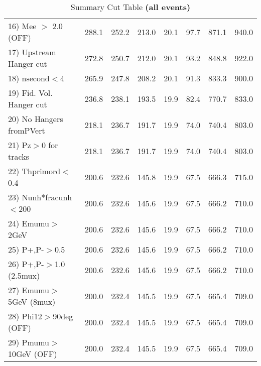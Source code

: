 \begin{table}[h!]
{{\begin{tabular}{||l||r|r|r|r|r||r||r||}
 16) Mee $>$ 2.0  (OFF)   &     288.1 &     252.2 &     213.0 &      20.1 &      97.7 &     871.1 &     940.0 \\
 17) Upstream Hanger cut  &     272.8 &     250.7 &     212.0 &      20.1 &      93.2 &     848.8 &     922.0 \\
 18) nsecond$<$4          &     265.9 &     247.8 &     208.2 &      20.1 &      91.3 &     833.3 &     900.0 \\
 19) Fid. Vol. Hanger cut &     236.8 &     238.1 &     193.5 &      19.9 &      82.4 &     770.7 &     833.0 \\
 20) No Hangers fromPVert &     218.1 &     236.7 &     191.7 &      19.9 &      74.0 &     740.4 &     803.0 \\
 21) Pz$>$0 for tracks    &     218.1 &     236.7 &     191.7 &      19.9 &      74.0 &     740.4 &     803.0 \\
 22) Thprimord$<$0.4      &     200.6 &     232.6 &     145.8 &      19.9 &      67.5 &     666.3 &     715.0 \\
 23) Nunh*fracunh$<$200   &     200.6 &     232.6 &     145.6 &      19.9 &      67.5 &     666.2 &     710.0 \\
 24) Emumu$>$2GeV         &     200.6 &     232.6 &     145.6 &      19.9 &      67.5 &     666.2 &     710.0 \\
 25) P+,P-$>$0.5          &     200.6 &     232.6 &     145.6 &      19.9 &      67.5 &     666.2 &     710.0 \\
 26) P+,P-$>$1.0 (2.5mux) &     200.6 &     232.6 &     145.6 &      19.9 &      67.5 &     666.2 &     710.0 \\
 27) Emumu$>$5GeV  (8mux) &     200.0 &     232.4 &     145.5 &      19.9 &      67.5 &     665.4 &     709.0 \\
 28) Phi12$>$90deg  (OFF) &     200.0 &     232.4 &     145.5 &      19.9 &      67.5 &     665.4 &     709.0 \\
 29) Pmumu$>$10GeV  (OFF) &     200.0 &     232.4 &     145.5 &      19.9 &      67.5 &     665.4 &     709.0 \\
 \hline
 \hline
 \end{tabular}
 \caption{Summary Cut Table \textbf{ (all events)}}
 \label{tab-sumcut}
 }}
 \end{table}
 \endinput

